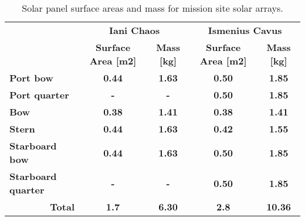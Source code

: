 \begin{table}[h]
\footnotesize
\centering
\caption{Solar panel surface areas and mass for mission site solar arrays.}
\label{tab:solar-panel-surface-areas}
\begin{tabular}{l|c|c|c|c|}
\cline{2-5}
\textbf{} & \multicolumn{2}{c|}{\textbf{Iani Chaos}} & \multicolumn{2}{c|}{\textbf{Ismenius Cavus}} \\ \cline{2-5}
 & \textbf{Surface Area {[}m2{]}} & \textbf{Mass {[}kg{]}} & \textbf{Surface Area {[}m2{]}} & \textbf{Mass {[}kg{]}} \\ \hline
\multicolumn{1}{|l|}{{\color[HTML]{A6DBA0} \textbf{Port bow}}} & {\color[HTML]{A6DBA0} \textbf{0.44}} & {\color[HTML]{A6DBA0} \textbf{1.63}} & {\color[HTML]{A6DBA0} \textbf{0.50}} & {\color[HTML]{A6DBA0} \textbf{1.85}} \\ \hline
\multicolumn{1}{|l|}{{\color[HTML]{5AAE61} \textbf{Port quarter}}} & {\color[HTML]{5AAE61} \textbf{-}} & {\color[HTML]{5AAE61} \textbf{-}} & {\color[HTML]{5AAE61} \textbf{0.50}} & {\color[HTML]{5AAE61} \textbf{1.85}} \\ \hline
\multicolumn{1}{|l|}{{\color[HTML]{F4A582} \textbf{Bow}}} & {\color[HTML]{F4A582} \textbf{0.38}} & {\color[HTML]{F4A582} \textbf{1.41}} & {\color[HTML]{F4A582} \textbf{0.38}} & {\color[HTML]{F4A582} \textbf{1.41}} \\ \hline
\multicolumn{1}{|l|}{{\color[HTML]{D6604D} \textbf{Stern}}} & {\color[HTML]{D6604D} \textbf{0.44}} & {\color[HTML]{D6604D} \textbf{1.63}} & {\color[HTML]{D6604D} \textbf{0.42}} & {\color[HTML]{D6604D} \textbf{1.55}} \\ \hline
\multicolumn{1}{|l|}{{\color[HTML]{92C5DE} \textbf{Starboard bow}}} & {\color[HTML]{92C5DE} \textbf{0.44}} & {\color[HTML]{92C5DE} \textbf{1.63}} & {\color[HTML]{92C5DE} \textbf{0.50}} & {\color[HTML]{92C5DE} \textbf{1.85}} \\ \hline
\multicolumn{1}{|l|}{{\color[HTML]{4393C3} \textbf{Starboard quarter}}} & {\color[HTML]{4393C3} \textbf{-}} & {\color[HTML]{4393C3} \textbf{-}} & {\color[HTML]{4393C3} \textbf{0.50}} & {\color[HTML]{4393C3} \textbf{1.85}} \\ \hline
\multicolumn{1}{|r|}{\textbf{Total}} & \textbf{1.7} & \textbf{6.30} & \textbf{2.8} & \textbf{10.36} \\ \hline
\end{tabular}
\end{table}
